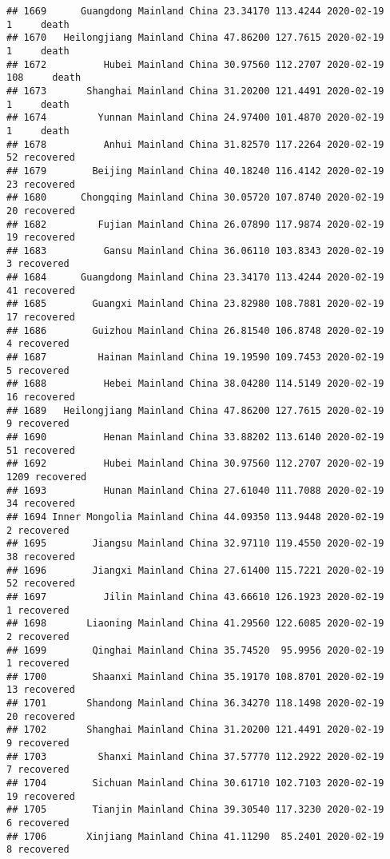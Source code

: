 \documentclass[
]{article}
\begin{document}
\begin{verbatim}
## 1669      Guangdong Mainland China 23.34170 113.4244 2020-02-19     1     death
## 1670   Heilongjiang Mainland China 47.86200 127.7615 2020-02-19     1     death
## 1672          Hubei Mainland China 30.97560 112.2707 2020-02-19   108     death
## 1673       Shanghai Mainland China 31.20200 121.4491 2020-02-19     1     death
## 1674         Yunnan Mainland China 24.97400 101.4870 2020-02-19     1     death
## 1678          Anhui Mainland China 31.82570 117.2264 2020-02-19    52 recovered
## 1679        Beijing Mainland China 40.18240 116.4142 2020-02-19    23 recovered
## 1680      Chongqing Mainland China 30.05720 107.8740 2020-02-19    20 recovered
## 1682         Fujian Mainland China 26.07890 117.9874 2020-02-19    19 recovered
## 1683          Gansu Mainland China 36.06110 103.8343 2020-02-19     3 recovered
## 1684      Guangdong Mainland China 23.34170 113.4244 2020-02-19    41 recovered
## 1685        Guangxi Mainland China 23.82980 108.7881 2020-02-19    17 recovered
## 1686        Guizhou Mainland China 26.81540 106.8748 2020-02-19     4 recovered
## 1687         Hainan Mainland China 19.19590 109.7453 2020-02-19     5 recovered
## 1688          Hebei Mainland China 38.04280 114.5149 2020-02-19    16 recovered
## 1689   Heilongjiang Mainland China 47.86200 127.7615 2020-02-19     9 recovered
## 1690          Henan Mainland China 33.88202 113.6140 2020-02-19    51 recovered
## 1692          Hubei Mainland China 30.97560 112.2707 2020-02-19  1209 recovered
## 1693          Hunan Mainland China 27.61040 111.7088 2020-02-19    34 recovered
## 1694 Inner Mongolia Mainland China 44.09350 113.9448 2020-02-19     2 recovered
## 1695        Jiangsu Mainland China 32.97110 119.4550 2020-02-19    38 recovered
## 1696        Jiangxi Mainland China 27.61400 115.7221 2020-02-19    52 recovered
## 1697          Jilin Mainland China 43.66610 126.1923 2020-02-19     1 recovered
## 1698       Liaoning Mainland China 41.29560 122.6085 2020-02-19     2 recovered
## 1699        Qinghai Mainland China 35.74520  95.9956 2020-02-19     1 recovered
## 1700        Shaanxi Mainland China 35.19170 108.8701 2020-02-19    13 recovered
## 1701       Shandong Mainland China 36.34270 118.1498 2020-02-19    20 recovered
## 1702       Shanghai Mainland China 31.20200 121.4491 2020-02-19     9 recovered
## 1703         Shanxi Mainland China 37.57770 112.2922 2020-02-19     7 recovered
## 1704        Sichuan Mainland China 30.61710 102.7103 2020-02-19    19 recovered
## 1705        Tianjin Mainland China 39.30540 117.3230 2020-02-19     6 recovered
## 1706       Xinjiang Mainland China 41.11290  85.2401 2020-02-19     8 recovered

\end{verbatim}
\end{document}

